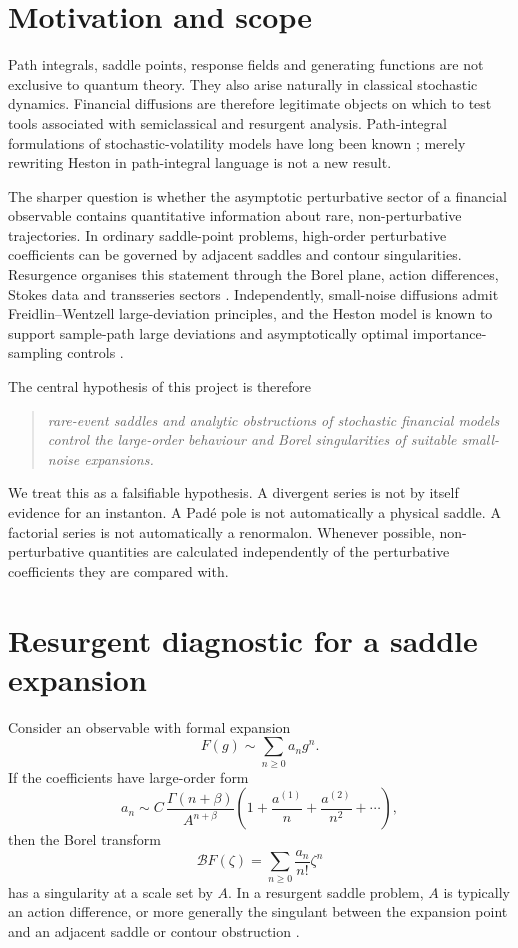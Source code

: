 \documentclass[11pt]{article}
\newcommand{\calB}{\mathcal B}
\begin{document}
\section{Motivation and scope}
Path integrals, saddle points, response fields and generating functions are not exclusive to quantum theory. They also arise naturally in classical stochastic dynamics. Financial diffusions are therefore legitimate objects on which to test tools associated with semiclassical and resurgent analysis. Path-integral formulations of stochastic-volatility models have long been known \citep{baaquie2002,contreras2014}; merely rewriting Heston in path-integral language is not a new result.

The sharper question is whether the asymptotic perturbative sector of a financial observable contains quantitative information about rare, non-perturbative trajectories. In ordinary saddle-point problems, high-order perturbative coefficients can be governed by adjacent saddles and contour singularities. Resurgence organises this statement through the Borel plane, action differences, Stokes data and transseries sectors \citep{berry1991,aniceto2019}. Independently, small-noise diffusions admit Freidlin--Wentzell large-deviation principles, and the Heston model is known to support sample-path large deviations and asymptotically optimal importance-sampling controls \citep{robertson2010,geha2024}.

The central hypothesis of this project is therefore
\begin{quote}
\emph{rare-event saddles and analytic obstructions of stochastic financial models control the large-order behaviour and Borel singularities of suitable small-noise expansions.}
\end{quote}
We treat this as a falsifiable hypothesis. A divergent series is not by itself evidence for an instanton. A Pad\'e pole is not automatically a physical saddle. A factorial series is not automatically a renormalon. Whenever possible, non-perturbative quantities are calculated independently of the perturbative coefficients they are compared with.

\section{Resurgent diagnostic for a saddle expansion}
Consider an observable with formal expansion
\begin{equation}
F(g)\sim\sum_{n\ge0}a_n g^n.
\end{equation}
If the coefficients have large-order form
\begin{equation}
 a_n\sim C\,\frac{\Gamma(n+\beta)}{A^{n+\beta}}
 \left(1+\frac{a^{(1)}}{n}+\frac{a^{(2)}}{n^2}+\cdots\right),
 \label{eq:largeorder}
\end{equation}
then the Borel transform
\begin{equation}
 \calB F(\zeta)=\sum_{n\ge0}\frac{a_n}{n!}\zeta^n
 \label{eq:borel}
\end{equation}
has a singularity at a scale set by $A$. In a resurgent saddle problem, $A$ is typically an action difference, or more generally the singulant between the expansion point and an adjacent saddle or contour obstruction \citep{berry1991,aniceto2019}.
\end{document}
